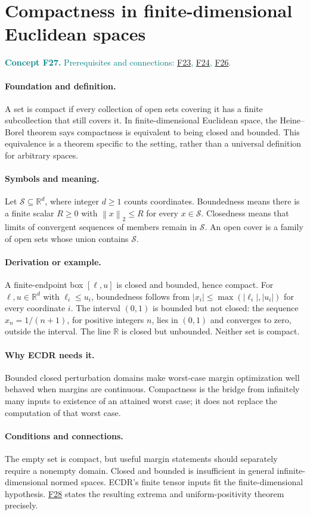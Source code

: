 \documentclass[11pt,a4paper]{article}
\newcommand{\R}{\mathbb R}
\newcommand{\norm}[1]{\left\lVert#1\right\rVert}
\newcommand{\conceptid}{Front matter}
\newcommand{\concept}[3]{\clearpage\renewcommand{\conceptid}{#1}%
\section{#2}\label{concept:#1}%
\textcolor{teal}{\textbf{Concept #1.} Prerequisites and connections: #3.}\par
\typeout{ECDR-CONCEPT-START #1 PAGE=\thepage}}
\begin{document}
\concept{F27}{Compactness in finite-dimensional Euclidean spaces}{\hyperref[concept:F23]{F23}, \hyperref[concept:F24]{F24}, \hyperref[concept:F26]{F26}}
\paragraph{Foundation and definition.}
A set is compact if every collection of open sets covering it has a
finite subcollection that still covers it. In finite-dimensional
Euclidean space, the Heine--Borel theorem says compactness is equivalent
to being closed and bounded. This equivalence is a theorem specific to
the setting, rather than a universal definition for arbitrary spaces.
\paragraph{Symbols and meaning.}
Let $\mathcal S\subseteq\R^d$, where integer $d\ge1$ counts
coordinates. Boundedness means there is a finite scalar $R\ge0$ with
$\norm{x}_2\le R$ for every $x\in\mathcal S$. Closedness means
that limits of convergent sequences of members remain in $\mathcal S$.
An open cover is a family of open sets whose union contains $\mathcal S$.
\paragraph{Derivation or example.}
A finite-endpoint box $[\ell,u]$ is closed and bounded, hence compact.
For $\ell,u\in\R^d$ with $\ell_i\le u_i$, boundedness follows from
$|x_i|\le\max(|\ell_i|,|u_i|)$ for every coordinate $i$.
The interval $(0,1)$ is bounded but not closed: the sequence
$x_n=1/(n+1)$, for positive integers $n$, lies in $(0,1)$ and converges to zero, outside the
interval. The line $\R$ is closed but unbounded. Neither set is compact.
\paragraph{Why ECDR needs it.}
Bounded closed perturbation domains make worst-case margin optimization
well behaved when margins are continuous. Compactness is the bridge
from infinitely many inputs to existence of an attained worst case;
it does not replace the computation of that worst case.
\paragraph{Conditions and connections.}
The empty set is compact, but useful margin statements should separately
require a nonempty domain. Closed and bounded is insufficient in
general infinite-dimensional normed spaces. ECDR's finite tensor inputs
fit the finite-dimensional hypothesis. \hyperref[concept:F28]{F28} states the resulting extrema
and uniform-positivity theorem precisely.
\par\label{endconcept:F27}
\end{document}
